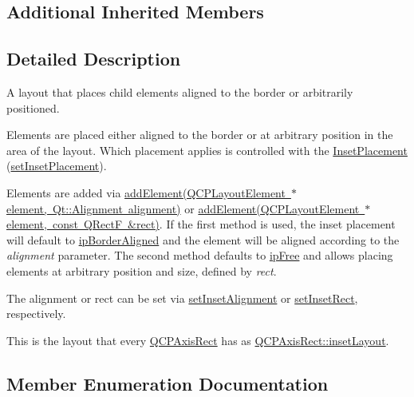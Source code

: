 \subsection*{Additional Inherited Members}


\subsection{Detailed Description}
A layout that places child elements aligned to the border or arbitrarily positioned. 

Elements are placed either aligned to the border or at arbitrary position in the area of the layout. Which placement applies is controlled with the \mbox{\hyperlink{class_q_c_p_layout_inset_a8b9e17d9a2768293d2a7d72f5e298192}{Inset\+Placement}} (\mbox{\hyperlink{class_q_c_p_layout_inset_a63298830744d5d8c5345511c00fd2144}{set\+Inset\+Placement}}).

Elements are added via \mbox{\hyperlink{class_q_c_p_layout_inset_ad61529eb576af7f04dff94abb10c745a}{add\+Element(\+Q\+C\+P\+Layout\+Element $\ast$element, Qt\+::\+Alignment alignment)}} or \mbox{\hyperlink{class_q_c_p_layout_inset_a8ff61fbee4a1f0ff45c398009d9f1e56}{add\+Element(\+Q\+C\+P\+Layout\+Element $\ast$element, const Q\+Rect\+F \&rect)}}. If the first method is used, the inset placement will default to \mbox{\hyperlink{class_q_c_p_layout_inset_a8b9e17d9a2768293d2a7d72f5e298192aa81e7df4a785ddee2229a8f47c46e817}{ip\+Border\+Aligned}} and the element will be aligned according to the {\itshape alignment} parameter. The second method defaults to \mbox{\hyperlink{class_q_c_p_layout_inset_a8b9e17d9a2768293d2a7d72f5e298192aa4802986ea2cea457f932b115acba59e}{ip\+Free}} and allows placing elements at arbitrary position and size, defined by {\itshape rect}.

The alignment or rect can be set via \mbox{\hyperlink{class_q_c_p_layout_inset_a62882a4f9ad58bb0f53da12fde022abe}{set\+Inset\+Alignment}} or \mbox{\hyperlink{class_q_c_p_layout_inset_aa487c8378a6f9533567a2e6430099dc3}{set\+Inset\+Rect}}, respectively.

This is the layout that every \mbox{\hyperlink{class_q_c_p_axis_rect}{Q\+C\+P\+Axis\+Rect}} has as \mbox{\hyperlink{class_q_c_p_axis_rect_a949f803466619924c7018df4b511ae10}{Q\+C\+P\+Axis\+Rect\+::inset\+Layout}}. 

\subsection{Member Enumeration Documentation}
\mbox{\label{class_q_c_p_layout_inset_a8b9e17d9a2768293d2a7d72f5e298192}} 
